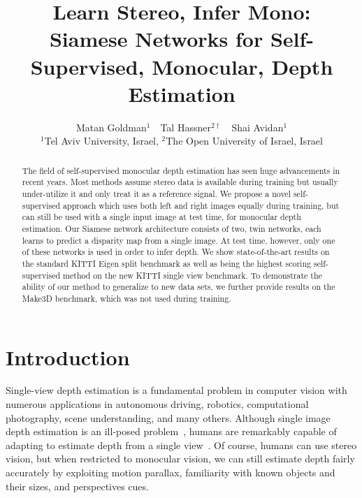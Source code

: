 \documentclass[10pt,twocolumn,letterpaper]{article}
\begin{document}
\title{Learn Stereo, Infer Mono:\\Siamese Networks for Self-Supervised, Monocular, Depth Estimation}


\renewcommand*{\Affilfont}{\small}
\setlength{\affilsep}{0.7em}

\author{
	Matan Goldman$^{1}$ \,\,
	Tal Hassner$^{2\dagger}$ \,\,
	Shai Avidan$^{1}$ \vspace{3pt}\\
	$^1$Tel Aviv University, Israel, $^2$The Open University of Israel, Israel}



\maketitle

\renewcommand*{\thefootnote}{$\dagger$}
\setcounter{footnote}{1}
\renewcommand*{\thefootnote}{\arabic{footnote}}
\setcounter{footnote}{0}
\thispagestyle{empty}


\begin{abstract}
	The field of self-supervised monocular depth estimation has seen huge advancements in recent years. Most methods assume stereo data is available during training but usually under-utilize it and only treat it as a reference signal. We propose a novel self-supervised approach which uses both left and right images equally during training, but can still be used with a single input image at test time, for monocular depth estimation. Our Siamese network architecture consists of two, twin networks, each learns to predict a disparity map from a single image. At test time, however, only one of these networks is used in order to infer depth. We show state-of-the-art results on the standard KITTI Eigen split benchmark as well as being the highest scoring self-supervised method on the new KITTI single view benchmark. To demonstrate the ability of our method to generalize to new data sets, we further provide results on the Make3D benchmark, which was not used during training.
\end{abstract}

\section{Introduction}

Single-view depth estimation is a fundamental problem in computer vision with numerous applications in autonomous driving, robotics, computational photography, scene understanding, and many others. Although single image depth estimation is an ill-posed problem~\cite{eigen2014depth,hassner2006example}, humans are remarkably capable of adapting to estimate depth from a single view~\cite{howard2012perceiving}. Of course, humans can use stereo vision, but when restricted to monocular vision, we can still estimate depth fairly accurately by exploiting motion parallax, familiarity with known objects and their sizes, and perspectives cues.
\end{document}
